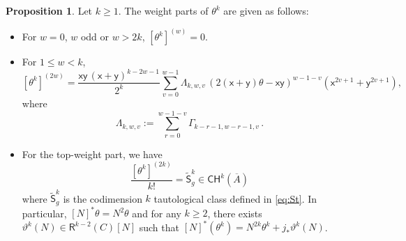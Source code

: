 \documentclass[11pt]{article}
\def\CH{\mathsf{CH}}
\def\R{\mathsf{R}}
\newcommand{\barA}{\overline{A}}
\newcommand{\St}{\widetilde{\mathsf{S}}}
\theoremstyle{definition}
\newtheorem{proposition}[definition]{Proposition}
\begin{document}
\begin{proposition}\label{pro:thetawt}
Let $k\geq 1$. The weight parts of $\theta^k$ are given as follows:
\begin{itemize}
    \item[(a)] For $w=0$, $w$ odd or $w >2k$, $[\theta^k]^{(w)}=0$.
    \item[(b)] For $1 \leq w <k$,
    $$
    [\theta^k]^{(2w)}
    =
    \frac{\mathsf{x}\mathsf{y}\,(\mathsf{x}+\mathsf{y})^{k-2w-1}}{2^k}
    \sum_{v=0}^{w-1}
    \Lambda_{k,w,v}\,
     (2(\mathsf{x}+\mathsf{y})\theta - \mathsf{x}\mathsf{y})^{w-1-v}(\mathsf{x}^{2v+1}+\mathsf{y}^{2v+1}),
    $$
    where
    $$
    \Lambda_{k,w,v}
    :=
    \sum_{r=0}^{w-1-v}\Gamma_{k-r-1,w-r-1,v}\, .
    $$
    \item[(c)] For the top-weight part, we have
    $$
    \frac{[\theta^k]^{(2k)}}{k!} = \St^k_g \in \CH^k(\barA)
    $$
    where $\St_g^k$ is the codimension $k$ tautological class defined in \eqref{eq:St}. In particular, $[N]^*\theta=N^2\theta$ and for any $k\ge 2$, there exists $\vartheta^k(N) \in \R^{k-2}(C)[N]$ such that $[N]^*(\theta^k) = N^{2k} \theta^k + j_*\vartheta^k(N)$.
\end{itemize}
\end{proposition}
\end{document}
